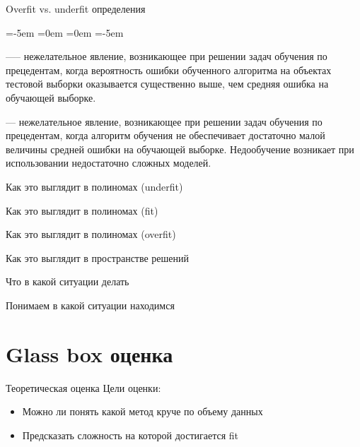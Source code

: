 \documentclass[14pt, fleqn, xcolor={dvipsnames, table}]{beamer}
\begin{document}
\begin{frame}{Overfit vs. underfit определения}
\begin{description}
\leftmargin=-5em
\itemindent=0em
=0em
\leftskip=-5em
  \item[Переобучение, переподгонка (overtraining, overfitting)] —-- нежелательное явление, возникающее при решении задач обучения по прецедентам, когда вероятность ошибки обученного алгоритма на объектах тестовой выборки оказывается существенно выше, чем средняя ошибка на обучающей выборке. 
  \item[Недообучение (underfitting)] --- нежелательное явление, возникающее при решении задач обучения по прецедентам, когда алгоритм обучения не обеспечивает достаточно малой величины средней ошибки на обучающей выборке. Недообучение возникает при использовании недостаточно сложных моделей.
\end{description}
\end{frame}

\begin{frame}{Как это выглядит в полиномах (underfit)}
\end{frame}

\begin{frame}{Как это выглядит в полиномах (fit)}
\end{frame}

\begin{frame}{Как это выглядит в полиномах (overfit)}
\end{frame}

\begin{frame}{Как это выглядит в пространстве решений}
\end{frame}

\begin{frame}{Что в какой ситуации делать}
\end{frame}

\begin{frame}{Понимаем в какой ситуации находимся}
\end{frame}

\section{Glass box оценка}
\begin{frame}{Теоретическая оценка}
Цели оценки:
\begin{itemize}
  \item Можно ли понять какой метод круче по объему данных
  \item Предсказать сложность на которой достигается fit
\end{itemize}
\end{frame}
\end{document}
